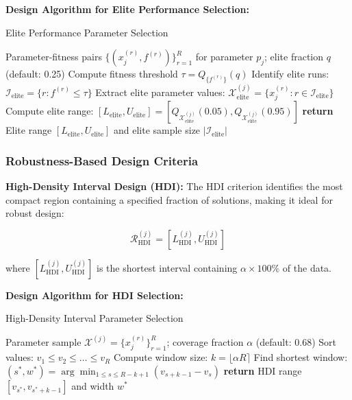 \documentclass[12pt,a4paper]{article}
\begin{document}
\textbf{Design Algorithm for Elite Performance Selection:}
\begin{algorithm}[H]
\caption{Elite Performance Parameter Selection}
\begin{algorithmic}[1]
\REQUIRE Parameter-fitness pairs $\{(x_j^{(r)}, f^{(r)})\}_{r=1}^R$ for parameter $p_j$; elite fraction $q$ (default: 0.25)
\STATE Compute fitness threshold $\tau = Q_{\{f^{(r)}\}}(q)$
\STATE Identify elite runs: $\mathcal{I}_{\text{elite}} = \{r : f^{(r)} \leq \tau\}$
\STATE Extract elite parameter values: $\mathcal{X}_{\text{elite}}^{(j)} = \{x_j^{(r)} : r \in \mathcal{I}_{\text{elite}}\}$
\STATE Compute elite range: $[L_{\text{elite}}, U_{\text{elite}}] = [Q_{\mathcal{X}_{\text{elite}}^{(j)}}(0.05), Q_{\mathcal{X}_{\text{elite}}^{(j)}}(0.95)]$
\STATE \textbf{return} Elite range $[L_{\text{elite}}, U_{\text{elite}}]$ and elite sample size $|\mathcal{I}_{\text{elite}}|$
\end{algorithmic}
\end{algorithm}

\subsubsection{Robustness-Based Design Criteria}

\textbf{High-Density Interval Design (HDI):}
The HDI criterion identifies the most compact region containing a specified fraction of solutions, making it ideal for robust design:

\begin{equation}
\mathcal{R}_{\text{HDI}}^{(j)} = [L_{\text{HDI}}^{(j)}, U_{\text{HDI}}^{(j)}]
\end{equation}

where $[L_{\text{HDI}}^{(j)}, U_{\text{HDI}}^{(j)}]$ is the shortest interval containing $\alpha \times 100\%$ of the data.

\textbf{Design Algorithm for HDI Selection:}
\begin{algorithm}[H]
\caption{High-Density Interval Parameter Selection}
\begin{algorithmic}[1]
\REQUIRE Parameter sample $\mathcal{X}^{(j)} = \{x_j^{(r)}\}_{r=1}^R$; coverage fraction $\alpha$ (default: 0.68)
\STATE Sort values: $v_1 \leq v_2 \leq \ldots \leq v_R$
\STATE Compute window size: $k = \lfloor \alpha R \rceil$
\STATE Find shortest window: $(s^*, w^*) = \arg\min_{1 \leq s \leq R-k+1} (v_{s+k-1} - v_s)$
\STATE \textbf{return} HDI range $[v_{s^*}, v_{s^*+k-1}]$ and width $w^*$
\end{algorithmic}
\end{algorithm}
\end{document}
